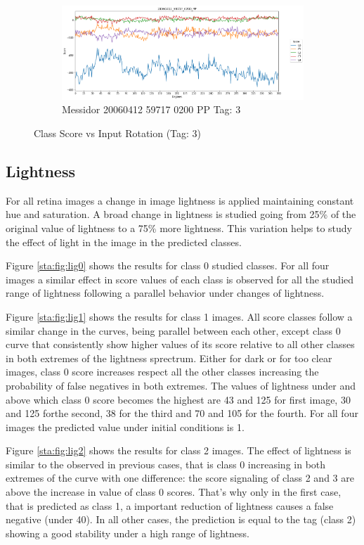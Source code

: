\begin{figure}[ht!]
\begin{subfigure}[b]{ 0.85\textwidth}
		\centering
		\includegraphics[width=\textwidth]{Figures/chapter_stability/20060412_59717_0200_PP/r/scores.png}
		\caption{Messidor 20060412 59717 0200 PP Tag: 3}		
	\end{subfigure}
	\hfill 
	\caption[Score vs Rotation (Tag: 3)]{Class Score vs Input Rotation (Tag: 3)}  
	\label{sta:fig:rot3} 
\end{figure}

\subsection{Lightness}

For all retina images a change in image lightness is applied maintaining constant hue and saturation. A broad change in lightness is studied going from 25\% of the original value of lightness to a 75\% more lightness. This variation helps to study the effect of light in the image in the predicted classes.

Figure \ref{sta:fig:lig0} shows the results for class 0 studied classes. For all four images a similar effect in score values of each class is observed for all the studied range of lightness following a parallel behavior under changes of lightness.

Figure \ref{sta:fig:lig1} shows the results for class 1 images. All score classes follow a similar change in the curves, being parallel between each other, except class 0 curve that consistently show higher values of its score relative to all other classes in both extremes of the lightness sprectrum. Either for dark or for too clear images, class 0 score increases respect all the other classes increasing the probability of false negatives in both extremes. The values of lightness under and above which class 0 score becomes the highest are 43 and 125 for first image, 30 and 125 forthe second, 38 for the third and 70 and 105 for the fourth. For all four images the predicted value under initial conditions is 1.

Figure \ref{sta:fig:lig2} shows the results for class 2 images. The effect of lightness is similar to the observed in previous cases, that is class 0 increasing in both extremes of the curve with one difference: the score signaling of class 2 and 3 are above the increase in value of class 0 scores. That's why only in the first case, that is predicted as class 1, a important reduction of lightness causes a false negative (under 40). In all other cases, the prediction is equal to the tag (class 2) showing a good stability under a high range of lightness.

